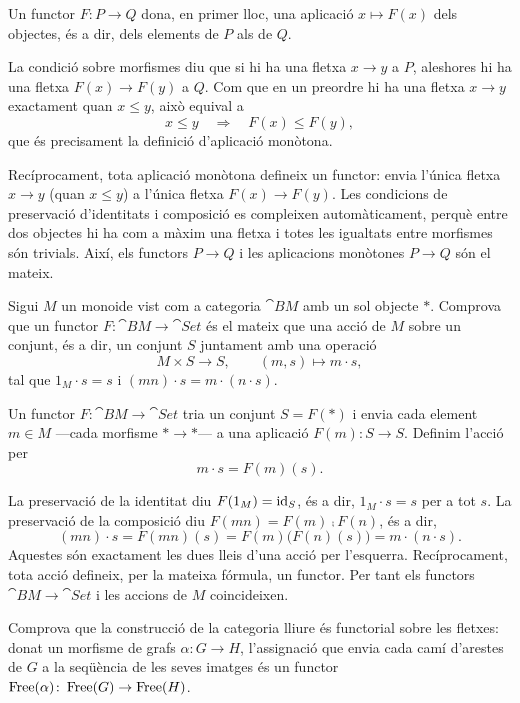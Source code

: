 \begin{solucio}
Un functor $F\colon P\to Q$ dona, en primer lloc, una aplicació $x\mapsto F(x)$ dels objectes, és a dir, dels elements de $P$ als de $Q$.

La condició sobre morfismes diu que si hi ha una fletxa $x\to y$ a $P$, aleshores hi ha una fletxa $F(x)\to F(y)$ a $Q$. Com que en un preordre hi ha una fletxa $x\to y$ exactament quan $x\leq y$, això equival a
\[
x\leq y
\quad\Longrightarrow\quad
F(x)\leq F(y),
\]
que és precisament la definició d'aplicació monòtona.

Recíprocament, tota aplicació monòtona defineix un functor: envia l'única fletxa $x\to y$ (quan $x\leq y$) a l'única fletxa $F(x)\to F(y)$. Les condicions de preservació d'identitats i composició es compleixen automàticament, perquè entre dos objectes hi ha com a màxim una fletxa i totes les igualtats entre morfismes són trivials. Així, els functors $P\to Q$ i les aplicacions monòtones $P\to Q$ són el mateix.
\end{solucio}

\begin{exercici}
Sigui $M$ un monoide vist com a categoria $\cat{B}M$ amb un sol objecte $\ast$. Comprova que un functor $F\colon\cat{B}M\to\cat{Set}$ és el mateix que una acció de $M$ sobre un conjunt, és a dir, un conjunt $S$ juntament amb una operació
\[
M\times S\to S,
\qquad
(m,s)\mapsto m\cdot s,
\]
tal que $1_M\cdot s=s$ i $(mn)\cdot s=m\cdot(n\cdot s)$.
\end{exercici}
\begin{solucio}
Un functor $F\colon\cat{B}M\to\cat{Set}$ tria un conjunt $S=F(\ast)$ i envia cada element $m\in M$ ---cada morfisme $\ast\to\ast$--- a una aplicació $F(m)\colon S\to S$. Definim l'acció per
\[
m\cdot s=F(m)(s).
\]

La preservació de la identitat diu $F(1_M)=\operatorname{id}_S$, és a dir, $1_M\cdot s=s$ per a tot $s$. La preservació de la composició diu $F(mn)=F(m)\comp F(n)$, és a dir,
\[
(mn)\cdot s=F(mn)(s)=F(m)\big(F(n)(s)\big)=m\cdot(n\cdot s).
\]
Aquestes són exactament les dues lleis d'una acció per l'esquerra. Recíprocament, tota acció defineix, per la mateixa fórmula, un functor. Per tant els functors $\cat{B}M\to\cat{Set}$ i les accions de $M$ coincideixen.
\end{solucio}

\begin{exercici}
Comprova que la construcció de la categoria lliure és functorial sobre les fletxes: donat un morfisme de grafs $\alpha\colon G\to H$, l'assignació que envia cada camí d'arestes de $G$ a la seqüència de les seves imatges és un functor $\operatorname{Free}(\alpha)\colon\operatorname{Free}(G)\to\operatorname{Free}(H)$.
\end{exercici}

